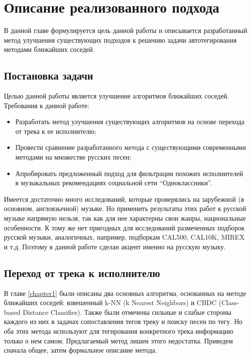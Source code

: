 \chapter{Описание реализованного подхода}
\label{chapter2}

В данной главе формулируется цель данной работы и описывается разработанный метод улучшения существующих подходов 
к решению задачи автотегирования методами ближайших соседей.

\section{Постановка задачи}
Целью данной работы является улучшение алгоритмов ближайших соседей. Требования к данной работе:
\begin{itemize}
 \item Разработать метод улучшения существующих алгоритмов на основе перехода от трека к ее исполнителю;
 \item Провести сравнение разработанного метода с существующими современными методами на множестве русских песен;
 \item Апробировать предложенный подход для фильтрации похожих исполнителей в музыкальных рекомендациях социальной сети ``Одноклассники''.
\end{itemize}

Имеется достаточно много исследований, которые проверялись на зарубежной (в основном, англоязычной) музыке. Но применить результаты этих работ к русской музыке напрямую нельзя, 
так как для нее характерны свои жанры, национальные особенности.
К тому же нет пригодных для исследований размеченных подборок русской музыки, аналогичных, например, подборкам CAL500, CAL10K, MIREX и т.д.
Поэтому в данной работе сделан акцент именно на русскую музыку.

\section{Переход от трека к исполнителю}

В главе \ref{chapter1} были описаны два основных алгоритма, основанных на методе ближайших соседей: взвешенный k-NN (k Nearest Neighbors) и CBDC (Class-based Distance Classifier).
Также были отмечены сильные и слабые стороны каждого из них в задачах сопоставления тегов треку и поиску песен по тегу. Но оба этих метода используют для тегирования конкретного трека
информацию только о нем самом. Предлагаемый метод лишен этого недостатка. Приведем сначала общее, затем формальное описание метода.


